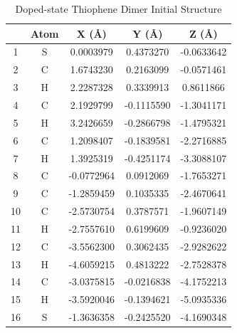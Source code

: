 \begin{table}[hbt!]\centering
\caption{Doped-state Thiophene Dimer Initial Structure}
\renewcommand{\arraystretch}{1.5}
\begin{threeparttable}
\begin{tabular}{ccccc}\toprule
{} & {Atom} & {X (\AA)} & {Y (\AA)} & {Z (\AA)} \\ \midrule
  1 & S & 0.0003979 & 0.4373270 & -0.0633642\\
  2 & C & 1.6743230 & 0.2163099 & -0.0571461\\
  3 & H & 2.2287328 & 0.3339913 & 0.8611866\\
  4 & C & 2.1929799 & -0.1115590 & -1.3041171\\ \midrule
  5 & H & 3.2426659 & -0.2866798 & -1.4795321\\
  6 & C & 1.2098407 & -0.1839581 & -2.2716885\\
  7 & H & 1.3925319 & -0.4251174 & -3.3088107\\
  8 & C & -0.0772964 & 0.0912069 & -1.7653271\\ \midrule
  9 & C & -1.2859459 & 0.1035335 & -2.4670641\\
  10 & C & -2.5730754 & 0.3787571 & -1.9607149\\
  11 & H & -2.7557610 & 0.6199609 & -0.9236020\\
  12 & C & -3.5562300 & 0.3062435 & -2.9282622\\ \midrule
  13 & H & -4.6059215 & 0.4813222 & -2.7528378\\
  14 & C & -3.0375815 & -0.0216838 & -4.1752213\\
  15 & H & -3.5920046 & -0.1394621 & -5.0935336\\
  16 & S & -1.3636358 & -0.2425520 & -4.1690348\\ \bottomrule
\end{tabular}
\begin{tablenotes}
\item
\end{tablenotes}
\end{threeparttable}
\end{table}

